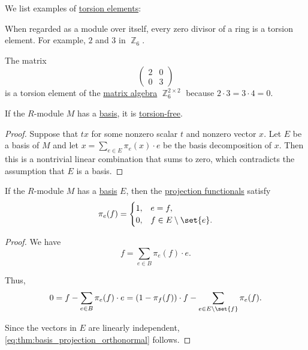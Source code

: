 \begin{example}\label{ex:def:semimodule_torsion}
  We list examples of \hyperref[def:semimodule_torsion]{torsion elements}:
  \begin{thmenum}
     When regarded as a module over itself, every zero divisor of a ring is a torsion element. For example, \( 2 \) and \( 3 \) in \( \BbbZ_6 \).

     The matrix
    \begin{equation*}
      \begin{pmatrix}
        2 & 0 \\
        0 & 3
      \end{pmatrix}
    \end{equation*}
    is a torsion element of the \hyperref[thm:matrix_algebra]{matrix algebra} \( \BbbZ_6^{2 \times 2} \) because \( 2 \cdot 3 = 3 \cdot 4 = 0 \).
  \end{thmenum}
\end{example}

\begin{proposition}\label{thm:basis_implies_torsion_free}
  If the \( R \)-module \( M \) has a \hyperref[def:hamel_basis]{basis}, it is \hyperref[def:semimodule_torsion]{torsion-free}.
\end{proposition}
\begin{proof}
  Suppose that \( tx \) for some nonzero scalar \( t \) and nonzero vector \( x \). Let \( E \) be a basis of \( M \) and let \( x = \sum_{e \in E} \pi_e(x) \cdot e \) be the basis decomposition of \( x \). Then this is a nontrivial linear combination that sums to zero, which contradicts the assumption that \( E \) is a basis.
\end{proof}

\begin{proposition}\label{thm:basis_projection_orthonormal}
  If the \( R \)-module \( M \) has a \hyperref[def:hamel_basis]{basis} \( E \), then the \hyperref[def:basis_decomposition]{projection functionals} satisfy
  \begin{equation}\label{eq:thm:basis_projection_orthonormal}
    \pi_e(f) = \begin{cases}
      1, &e = f, \\
      0, &f \in E \setminus \set{ e }.
    \end{cases}
  \end{equation}
\end{proposition}
\begin{proof}
  We have
  \begin{equation*}
    f = \sum_{e \in B} \pi_e(f) \cdot e.
  \end{equation*}

  Thus,
  \begin{equation*}
    0 = f - \sum_{e \in B} \pi_e(f) \cdot e = (1 - \pi_f(f)) \cdot f - \sum_{e \in E \setminus \set{ f }} \pi_e(f).
  \end{equation*}

  Since the vectors in \( E \) are linearly independent, \eqref{eq:thm:basis_projection_orthonormal} follows.
\end{proof}

